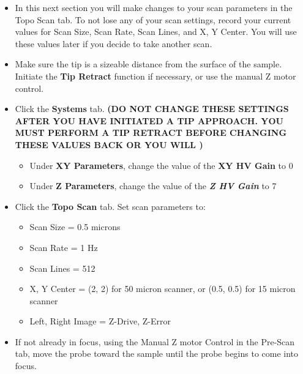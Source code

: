 \documentclass{../lab}
\begin{document}
    \begin{itemize}
        \item In this next section you will make changes to your scan parameters in the Topo Scan tab.  To not lose any of your scan settings, record your current values for Scan Size, Scan Rate, Scan Lines, and X, Y Center.  You will use these values later if you decide to take another scan.

        \item Make sure the tip is a sizeable distance from the surface of the sample.  Initiate the \textbf{Tip Retract }function if necessary, or use the manual Z motor control.

        \item Click the \textbf{Systems} tab. \textbf{(DO NOT CHANGE THESE SETTINGS AFTER YOU HAVE INITIATED A TIP APPROACH.  YOU MUST PERFORM A TIP RETRACT BEFORE CHANGING THESE VALUES BACK OR YOU WILL )}

    \begin{itemize}
        \item ​​Under \textbf{XY Parameters}, change the value of the \textbf{XY HV Gain} to 0

        \item Under \textbf{Z Parameters}, change the value of the \emph{\textbf{Z HV Gain}} to 7

    \end{itemize}

        \item Click the \textbf{Topo Scan} tab.  Set scan parameters to:

        \begin{itemize}
            \item Scan Size = 0.5 microns

            \item Scan Rate = 1 Hz

            \item Scan Lines = 512

            \item X, Y Center = (2, 2) for 50 micron scanner, or (0.5, 0.5) for 15 micron scanner

            \item Left, Right Image = Z-Drive, Z-Error

        \end{itemize}

        \item If not already in focus, using the Manual Z motor Control in the Pre-Scan tab, move the probe toward the sample until the probe begins to come into focus.


\end{itemize}
\end{document}
